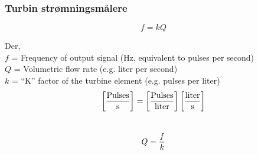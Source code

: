 \documentclass[aspectratio=169,xcolor=dvipsnames]{beamer}
\begin{document}
%
%
%
\begin{frame}
	\frametitle{Turbin strømningsmålere}
$$f = kQ$$

Der,
\\
$f$ = Frequency of output signal (Hz, equivalent to pulses per second)
\\
$Q$ = Volumetric flow rate (e.g. liter per second)
\\
$k$ = ``K'' factor of the turbine element (e.g. pulses per liter)
\\
$$\left[\hbox{Pulses} \over \hbox{s} \right] = \left[\hbox{Pulses} \over \hbox{liter} \right] \left[\hbox{liter} \over \hbox{s} \right]$$
\\
$$Q = {f \over k}$$

\end{frame}
\end{document}
